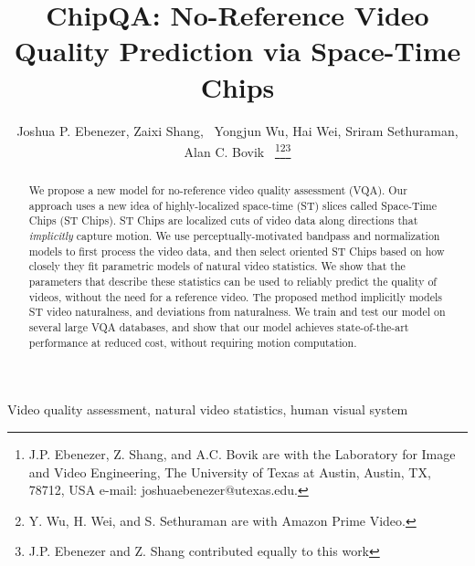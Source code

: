 \documentclass[journal]{IEEEtran}
\begin{document}
\title{ChipQA: No-Reference Video Quality Prediction via Space-Time Chips}


\author{Joshua P. Ebenezer,
        Zaixi Shang,~
        Yongjun Wu, Hai Wei, Sriram Sethuraman, Alan C. Bovik~ \thanks{J.P. Ebenezer, Z. Shang, and A.C. Bovik are with the Laboratory for Image and Video Engineering, The University of Texas at Austin, Austin,
TX, 78712, USA e-mail: joshuaebenezer@utexas.edu.}\thanks{Y. Wu, H. Wei, and  S. Sethuraman are with Amazon Prime Video.}\thanks{J.P. Ebenezer and Z. Shang contributed equally to this work}}



















\maketitle

\begin{abstract}
We propose a new model for no-reference video quality assessment (VQA). Our approach uses a new idea of highly-localized space-time (ST) slices called Space-Time Chips (ST Chips). ST Chips are localized cuts of video data along directions that \textit{implicitly} capture motion. We use perceptually-motivated bandpass and normalization models to first process the video data, and then select oriented ST Chips based on how closely they fit parametric models of natural video statistics. We show that the parameters that describe these statistics can be used to reliably predict the quality of videos, without the need for a reference video. The proposed method implicitly models ST video naturalness, and deviations from naturalness. We train and test our model on several large VQA databases, and show that our model achieves state-of-the-art performance at reduced cost, without requiring motion computation. 
\end{abstract}

\begin{IEEEkeywords}
Video quality assessment, natural video statistics, human visual system
\end{IEEEkeywords}
\end{document}
